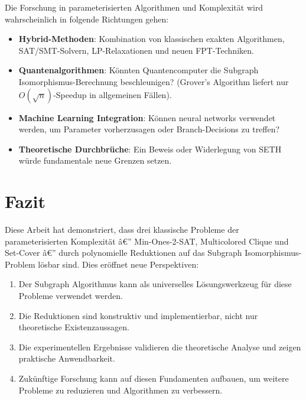 ﻿\documentclass[a4paper,12pt]{article}
\theoremstyle{definition}
\begin{document}
Die Forschung in parameterisierten Algorithmen und Komplexität wird wahrscheinlich in folgende Richtungen gehen:

\begin{itemize}
	\item \textbf{Hybrid-Methoden}: Kombination von klassischen exakten Algorithmen, SAT/SMT-Solvern, LP-Relaxationen und neuen FPT-Techniken.
	
	\item \textbf{Quantenalgorithmen}: Könnten Quantencomputer die Subgraph Isomorphismus-Berechnung beschleunigen? (Grover's Algorithm liefert nur $O(\sqrt{n})$-Speedup in allgemeinen Fällen).
	
	\item \textbf{Machine Learning Integration}: Können neural networks verwendet werden, um Parameter vorherzusagen oder Branch-Decisions zu treffen?
	
	\item \textbf{Theoretische Durchbrüche}: Ein Beweis oder Widerlegung von SETH würde fundamentale neue Grenzen setzen.
\end{itemize}

\section*{Fazit}

Diese Arbeit hat demonstriert, dass drei klassische Probleme der parameterisierten Komplexität â€” Min-Ones-2-SAT, Multicolored Clique und Set-Cover â€” durch polynomielle Reduktionen auf das Subgraph Isomorphismus-Problem lösbar sind. Dies eröffnet neue Perspektiven:

\begin{enumerate}
	\item Der Subgraph Algorithmus kann als universelles Lösungswerkzeug für diese Probleme verwendet werden.
	
	\item Die Reduktionen sind konstruktiv und implementierbar, nicht nur theoretische Existenzaussagen.
	
	\item Die experimentellen Ergebnisse validieren die theoretische Analyse und zeigen praktische Anwendbarkeit.
	
	\item Zukünftige Forschung kann auf diesen Fundamenten aufbauen, um weitere Probleme zu reduzieren und Algorithmen zu verbessern.
\end{enumerate}
\end{document}
